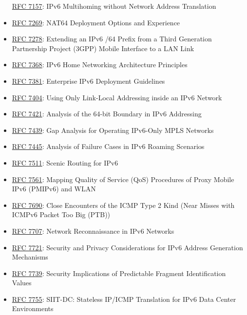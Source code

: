 \documentclass[
]{article}
\begin{document}
\begin{itemize}
  \href{https://www.rfc-editor.org/info/rfc7157}{RFC 7157}: IPv6
  Multihoming without Network Address Translation
\item
  \href{https://www.rfc-editor.org/info/rfc7269}{RFC 7269}: NAT64
  Deployment Options and Experience
\item
  \href{https://www.rfc-editor.org/info/rfc7278}{RFC 7278}: Extending an
  IPv6 /64 Prefix from a Third Generation Partnership Project (3GPP)
  Mobile Interface to a LAN Link
\item
  \href{https://www.rfc-editor.org/info/rfc7368}{RFC 7368}: IPv6 Home
  Networking Architecture Principles
\item
  \href{https://www.rfc-editor.org/info/rfc7381}{RFC 7381}: Enterprise
  IPv6 Deployment Guidelines
\item
  \href{https://www.rfc-editor.org/info/rfc7404}{RFC 7404}: Using Only
  Link-Local Addressing inside an IPv6 Network
\item
  \href{https://www.rfc-editor.org/info/rfc7421}{RFC 7421}: Analysis of
  the 64-bit Boundary in IPv6 Addressing
\item
  \href{https://www.rfc-editor.org/info/rfc7439}{RFC 7439}: Gap Analysis
  for Operating IPv6-Only MPLS Networks
\item
  \href{https://www.rfc-editor.org/info/rfc7445}{RFC 7445}: Analysis of
  Failure Cases in IPv6 Roaming Scenarios
\item
  \href{https://www.rfc-editor.org/info/rfc7511}{RFC 7511}: Scenic
  Routing for IPv6
\item
  \href{https://www.rfc-editor.org/info/rfc7561}{RFC 7561}: Mapping
  Quality of Service (QoS) Procedures of Proxy Mobile IPv6 (PMIPv6) and
  WLAN
\item
  \href{https://www.rfc-editor.org/info/rfc7690}{RFC 7690}: Close
  Encounters of the ICMP Type 2 Kind (Near Misses with ICMPv6 Packet Too
  Big (PTB))
\item
  \href{https://www.rfc-editor.org/info/rfc7707}{RFC 7707}: Network
  Reconnaissance in IPv6 Networks
\item
  \href{https://www.rfc-editor.org/info/rfc7721}{RFC 7721}: Security and
  Privacy Considerations for IPv6 Address Generation Mechanisms
\item
  \href{https://www.rfc-editor.org/info/rfc7739}{RFC 7739}: Security
  Implications of Predictable Fragment Identification Values
\item
  \href{https://www.rfc-editor.org/info/rfc7755}{RFC 7755}: SIIT-DC:
  Stateless IP/ICMP Translation for IPv6 Data Center Environments

\end{itemize}
\end{document}
